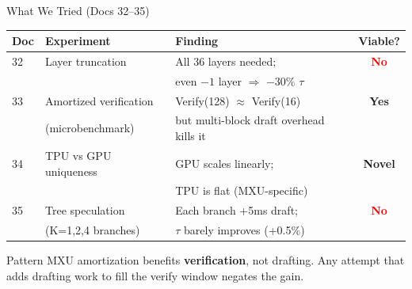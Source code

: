 \documentclass[10pt]{beamer}
\begin{document}
\begin{frame}{What We Tried (Docs 32--35)}
\centering
\footnotesize
\begin{tabular}{l l l c}
\toprule
\textbf{Doc} & \textbf{Experiment} & \textbf{Finding} & \textbf{Viable?} \\
\midrule
32 & Layer truncation & All 36 layers needed; & \textcolor{red}{\textbf{No}} \\
   & & even $-1$ layer $\Rightarrow$ $-30\%$ $\tau$ & \\
\midrule
33 & Amortized verification & Verify(128) $\approx$ Verify(16) & \textcolor{green!60!black}{\textbf{Yes}} \\
   & (microbenchmark) & but multi-block draft overhead kills it & \\
\midrule
34 & TPU vs GPU uniqueness & GPU scales linearly; & \textcolor{green!60!black}{\textbf{Novel}} \\
   & & TPU is flat (MXU-specific) & \\
\midrule
35 & Tree speculation & Each branch +5ms draft; & \textcolor{red}{\textbf{No}} \\
   & (K=1,2,4 branches) & $\tau$ barely improves (+0.5\%) & \\
\bottomrule
\end{tabular}

\vspace{0.8em}
\begin{alertblock}{Pattern}
MXU amortization benefits \textbf{verification}, not drafting.
Any attempt that adds drafting work to fill the verify window negates the gain.
\end{alertblock}
\end{frame}
\end{document}
